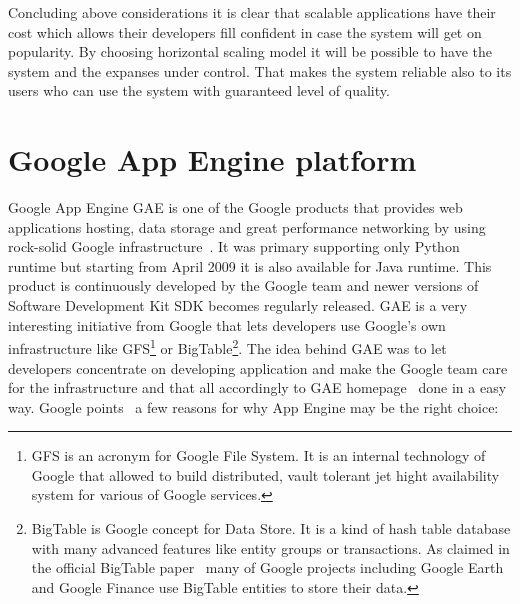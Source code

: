 Concluding above considerations it is clear that scalable applications have their cost which allows their developers fill confident in case the system will get on popularity. By choosing horizontal scaling model it will be possible to have the system and the expanses under control. That makes the system reliable also to its users who can use the system with guaranteed level of quality.         
 
\section{Google App Engine platform}\label{sec:gae_general}
Google App Engine GAE is one of the Google products that provides web applications hosting, data storage and great performance networking by using rock-solid Google infrastructure~\cite[page 1]{gae_develop}. It was primary supporting only Python runtime but starting from April 2009 it is also available for Java runtime. This product is continuously developed by the Google team and newer versions of Software Development Kit SDK becomes regularly released. GAE is a very interesting initiative from Google that lets developers use Google's own infrastructure like GFS\footnote{GFS is an acronym for Google File System. It is an internal technology of Google that allowed to build distributed, vault tolerant jet hight availability system for various of Google services.} or BigTable\footnote{BigTable is Google concept for Data Store. It is a kind of hash table database with many advanced features like entity groups or transactions. As claimed in the official BigTable paper~\cite{bigtable_about} many of Google projects including Google Earth and Google Finance use BigTable entities to store their data.}. The idea behind GAE was to let developers concentrate on developing application and make the Google team care for the infrastructure and that all accordingly to GAE homepage~\cite{gae_homepage} done in a easy way. Google points~\cite{gae_why} a few reasons for why App Engine may be the right choice: 
